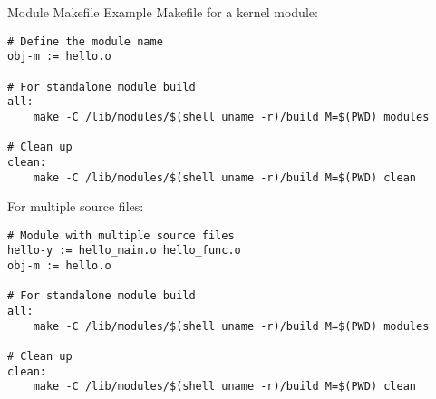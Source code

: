 \begin{code}{Module Makefile}
    Example Makefile for a kernel module:
    
\begin{lstlisting}[style=basesmol]
# Define the module name
obj-m := hello.o

# For standalone module build
all:
	make -C /lib/modules/$(shell uname -r)/build M=$(PWD) modules

# Clean up
clean:
	make -C /lib/modules/$(shell uname -r)/build M=$(PWD) clean
\end{lstlisting}

    For multiple source files:
    
\begin{lstlisting}[style=basesmol]
# Module with multiple source files
hello-y := hello_main.o hello_func.o
obj-m := hello.o

# For standalone module build
all:
	make -C /lib/modules/$(shell uname -r)/build M=$(PWD) modules

# Clean up
clean:
	make -C /lib/modules/$(shell uname -r)/build M=$(PWD) clean
\end{lstlisting}
\end{code}


